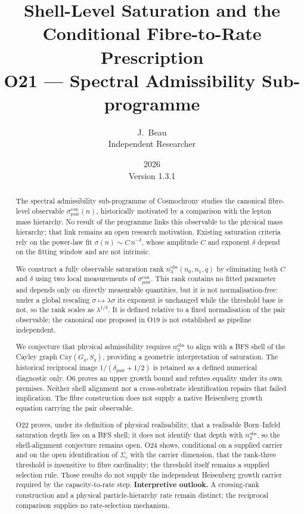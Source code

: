 \documentclass[11pt,a4paper]{article}
\title{Shell-Level Saturation and the Conditional
  Fibre-to-Rate Prescription\\[0.5ex]
  \large O21 --- Spectral Admissibility Sub-programme}
\author{J.~Beau\\[0.5ex]
\small Independent Researcher}
\date{2026\\Version 1.3.1}
\theoremstyle{definition}
\theoremstyle{remark}
\begin{document}
  \maketitle

  \begin{abstract}
    The spectral admissibility sub-programme of Cosmochrony studies the
    canonical fibre-level observable
    $\sigma_{\mathrm{pair}}^{\mathrm{can}}(n)$, historically motivated by a
    comparison with the lepton mass hierarchy.
    No result of the programme links this observable to the physical mass
    hierarchy; that link remains an open research motivation.
    Existing saturation criteria rely on the power-law
    fit $\sigma(n) \sim C\,n^{-\delta}$, whose amplitude $C$ and
    exponent $\delta$ depend on the fitting window and are not
    intrinsic.

    We construct a fully observable saturation rank
    $n_3^{\mathrm{obs}}(n_0, n_1, q)$ by eliminating both $C$
    and $\delta$ using two local measurements of
    $\sigma_{\mathrm{pair}}^{\mathrm{can}}$.
    This rank contains no fitted parameter and depends only on
    directly measurable quantities, but it is not normalisation-free:
    under a global rescaling $\sigma \mapsto \lambda\sigma$ its exponent
    is unchanged while the threshold base is not, so the rank scales as
    $\lambda^{1/\delta}$.
    It is defined relative to a fixed normalisation of the pair observable;
    the canonical one proposed in O19 is not established as pipeline independent.

    We conjecture that physical admissibility requires
    $n_3^{\mathrm{obs}}$ to align with a BFS shell of the Cayley
    graph $\mathrm{Cay}(G_q, S_q)$, providing a geometric
    interpretation of saturation.
    The historical reciprocal image $1/(\delta_{\mathrm{pair}}+1/2)$ is retained as a
    defined numerical diagnostic only.
    O6 proves an upper growth bound and refutes equality under its own premises.
    Neither shell alignment nor a cross-substrate identification repairs that failed implication.
    The fibre construction does not supply a native Heisenberg
    growth equation carrying the pair observable.

    O22 proves, under its definition of physical realisability, that a
    realisable Born--Infeld saturation depth lies on a BFS shell; it does
    not identify that depth with $n_3^{\mathrm{obs}}$, so the shell-alignment
    conjecture remains open.
    O24 shows,
    conditional on a supplied carrier and on the open identification of
    $\Sigma_c$ with the carrier dimension, that the rank-three threshold
    is insensitive to fibre cardinality; the threshold itself remains a
    supplied selection rule.
    Those results do not supply the independent Heisenberg
    growth carrier required by the capacity-to-rate step.
    \textbf{Interpretive outlook.}
    A crossing-rank construction and a physical particle-hierarchy rate remain distinct; the
    reciprocal comparison supplies no rate-selection mechanism.
  \end{abstract}
\end{document}
